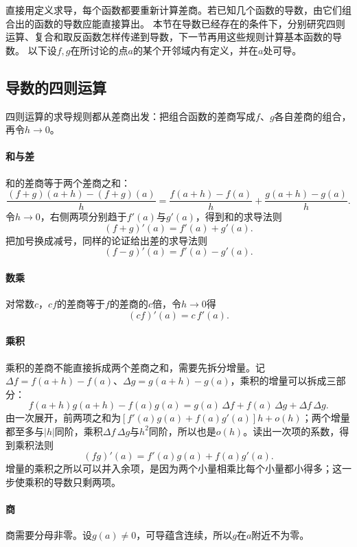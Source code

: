 直接用定义求导，每个函数都要重新计算差商。若已知几个函数的导数，由它们组合出的函数的导数应能直接算出。
本节在导数已经存在的条件下，分别研究四则运算、复合和取反函数怎样传递到导数，下一节再用这些规则计算基本函数的导数。
以下设$f,g$在所讨论的点$a$的某个开邻域内有定义，并在$a$处可导。

\subsection{导数的四则运算}
\label{sec:ru-derivative-arithmetic}

四则运算的求导规则都从差商出发：把组合函数的差商写成$f$、$g$各自差商的组合，再令$h\to0$。

\paragraph{和与差}
和的差商等于两个差商之和：
\[
 \frac{(f+g)(a+h)-(f+g)(a)}h=\frac{f(a+h)-f(a)}h+\frac{g(a+h)-g(a)}h.
\]
令$h\to0$，右侧两项分别趋于$f'(a)$与$g'(a)$，得到和的求导法则
\[
 (f+g)'(a)=f'(a)+g'(a).
\]
把加号换成减号，同样的论证给出差的求导法则
\[
 (f-g)'(a)=f'(a)-g'(a).
\]

\paragraph{数乘}
对常数$c$，$cf$的差商等于$f$的差商的$c$倍，令$h\to0$得
\[
 (cf)'(a)=c\,f'(a).
\]

\paragraph{乘积}
乘积的差商不能直接拆成两个差商之和，需要先拆分增量。记$\Delta f=f(a+h)-f(a)$、$\Delta g=g(a+h)-g(a)$，乘积的增量可以拆成三部分：
\[
 f(a+h)g(a+h)-f(a)g(a)=g(a)\,\Delta f+f(a)\,\Delta g+\Delta f\,\Delta g.
\]
由一次展开，前两项之和为$[f'(a)g(a)+f(a)g'(a)]h+o(h)$；两个增量都至多与$|h|$同阶，乘积$\Delta f\,\Delta g$与$h^2$同阶，所以也是$o(h)$。读出一次项的系数，得到乘积法则
\begin{equation}
 (fg)'(a)=f'(a)g(a)+f(a)g'(a).
 \label{eq:analysis-scalar-sum-product-rules}
\end{equation}
增量的乘积之所以可以并入余项，是因为两个小量相乘比每个小量都小得多；这一步使乘积的导数只剩两项。

\paragraph{商}
商需要分母非零。设$g(a)\neq0$，可导蕴含连续，所以$g$在$a$附近不为零。

